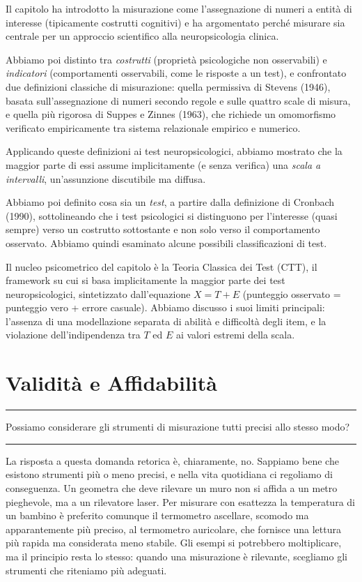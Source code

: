 \documentclass[
  italian,
  letterpaper,
  paper=6in:9in,
  pagesize=pdftex,
  headinclude=on,
  footinclude=on,
  11pt]{scrbook}
\newenvironment{domanda}{%
  \par\medskip\noindent\rule{\linewidth}{0.4pt}\vspace{3pt}%
  \begin{center}\large\itshape
}{%
  \end{center}\vspace{-4pt}\noindent\rule{\linewidth}{0.4pt}\par\medskip
}
\begin{document}
Il capitolo ha introdotto la misurazione come l'assegnazione di numeri a
entità di interesse (tipicamente costrutti cognitivi) e ha argomentato
perché misurare sia centrale per un approccio scientifico alla
neuropsicologia clinica.

Abbiamo poi distinto tra \emph{costrutti} (proprietà psicologiche non
osservabili) e \emph{indicatori} (comportamenti osservabili, come le
risposte a un test), e confrontato due definizioni classiche di
misurazione: quella permissiva di Stevens (1946), basata
sull'assegnazione di numeri secondo regole e sulle quattro scale di
misura, e quella più rigorosa di Suppes e Zinnes (1963), che richiede un
omomorfismo verificato empiricamente tra sistema relazionale empirico e
numerico.

Applicando queste definizioni ai test neuropsicologici, abbiamo mostrato
che la maggior parte di essi assume implicitamente (e senza verifica)
una \emph{scala a intervalli}, un'assunzione discutibile ma diffusa.

Abbiamo poi definito cosa sia un \emph{test}, a partire dalla
definizione di Cronbach (1990), sottolineando che i test psicologici si
distinguono per l'interesse (quasi sempre) verso un costrutto
sottostante e non solo verso il comportamento osservato. Abbiamo quindi
esaminato alcune possibili classificazioni di test.

Il nucleo psicometrico del capitolo è la Teoria Classica dei Test (CTT),
il framework su cui si basa implicitamente la maggior parte dei test
neuropsicologici, sintetizzato dall'equazione \(X = T + E\) (punteggio
osservato = punteggio vero + errore casuale). Abbiamo discusso i suoi
limiti principali: l'assenza di una modellazione separata di abilità e
difficoltà degli item, e la violazione dell'indipendenza tra \(T\) ed
\(E\) ai valori estremi della scala.


\chapter{Validità e Affidabilità}\label{validita-e-affidabilita}

\begin{domanda}

Possiamo considerare gli strumenti di misurazione tutti precisi allo
stesso modo?

\end{domanda}

La risposta a questa domanda retorica è, chiaramente, no. Sappiamo bene
che esistono strumenti più o meno precisi, e nella vita quotidiana ci
regoliamo di conseguenza. Un geometra che deve rilevare un muro non si
affida a un metro pieghevole, ma a un rilevatore laser. Per misurare con
esattezza la temperatura di un bambino è preferito comunque il
termometro ascellare, scomodo ma apparantemente più preciso, al
termometro auricolare, che fornisce una lettura più rapida ma
considerata meno stabile. Gli esempi si potrebbero moltiplicare, ma il
principio resta lo stesso: quando una misurazione è rilevante, scegliamo
gli strumenti che riteniamo più adeguati.
\end{document}
